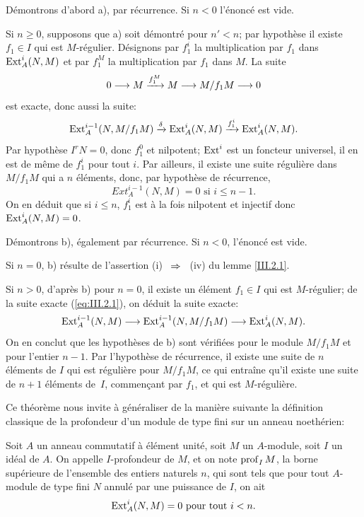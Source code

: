 D\'emontrons d'abord a), par r\'ecurrence. Si $n<0$ l'\'enonc\'e est vide.

Si $n\geq 0$, supposons que a) soit d\'emontr\'e pour $n'<n$; par hypoth\`ese il existe $f_1\in I$ qui est $M$-r\'egulier. D\'esignons par $f_1^i$ la multiplication par $f_1$ dans $\operatorname{Ext}_A^i(N, M)$ et par $f_1^M$ la multiplication par $f_1$ dans $M$. La suite
\begin{equation} \label{eq:III.2.1}
0 \to M \lto{f_1^M} M \to M/f_1M \to 0
\end{equation}
est exacte, donc aussi la suite:
\[
\operatorname{Ext}_A^{i-1} (N, M/f_1M) \xrightarrow{\delta}\operatorname{Ext}_A^i (N, M) \xrightarrow{f_1^i} \operatorname{Ext}_A^i (N, M).
\]
Par hypoth\`ese $I^rN=0$, donc $f_1^0$ et nilpotent; $\operatorname{Ext}^i$ est un foncteur universel, il en est de m\^eme de $f_1^i$ pour tout $i$. Par ailleurs, il existe une suite r\'eguli\`ere dans $M/f_1 M$ qui a $n$ \'el\'ements, donc, par hypoth\`ese de r\'ecurrence,
\[
Ext_A^{i-1}(N, M)=0 \text{ si } i\leq n-1.
\]
On en d\'eduit que si $i\leq n$, $f_1^i$ est \`a la fois nilpotent et injectif donc $\operatorname{Ext}_A^i(N, M)=0$.

D\'emontrons b), \'egalement par r\'ecurrence. Si $n<0$, l'\'enonc\'e est vide.

Si $n=0$, b) r\'esulte de l'assertion (i) ~$\To$~ (iv) du lemme \ref{III.2.1}.

Si $n>0$, d'apr\`es b) pour $n=0$, il existe un \'el\'ement $f_1\in I$ qui est $M$-r\'egulier; de la suite exacte (\ref{eq:III.2.1}), on d\'eduit la suite exacte:
\begin{equation} \label{eq:III.2.2} \Ext_A^{i-1} (N, M) \to \Ext_A^{i-1} (N, M/f_1M) \to \Ext_A^i (N, M).
\end{equation}
On en conclut que les hypoth\`eses de b) sont v\'erifi\'ees pour le
module $M/f_1M$ et pour l'entier $n-1$. Par l'hypoth\`ese de
r\'ecurrence, il existe une suite de $n$ \'el\'ements de $I$ qui est
r\'eguli\`ere pour $M/f_1M$, ce qui entra\^ine qu'il existe une
suite de $n+1$ \'el\'ements de~$I$, commen\c cant par $f_1$, et qui
est $M$-r\'eguli\`ere.

Ce th\'eor\`eme nous invite \`a g\'en\'eraliser de la mani\`ere suivante la d\'efinition classique de la profondeur d'un module de type fini sur un anneau noeth\'erien:

\begin{definition} \label{III.2.3}
Soit $A$ un anneau commutatif \`a \'el\'ement unit\'e, soit $M$ un $A$-module, soit $I$ un id\'eal de $A$. On appelle $I$-profondeur de $M$, et on note $\operatorname{prof}_I M$, la borne sup\'erieure \ignorespaces de l'ensemble des entiers naturels $n$, qui sont tels que pour tout $A$-module de type fini $N$ annul\'e par une puissance de $I$, on ait
\[
\operatorname{Ext}_A^i(N, M)=0 \text{ pour tout } i< n.
\]
\end{definition}

